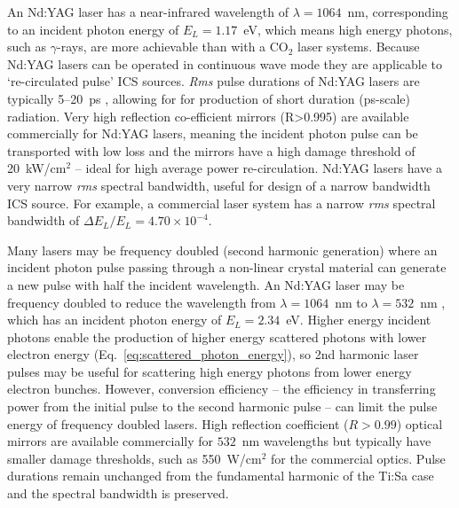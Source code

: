 \documentclass[../main.tex]{subfiles}
\begin{document}
An Nd:YAG laser has a near-infrared wavelength of $\lambda=1064$~\si{\nano\meter}, corresponding to an incident photon energy of $E_{L}=1.17$~\si{\electronvolt}, which means high energy photons, such as $\gamma$-rays, are more achievable than with a CO$_{2}$ laser systems. Because Nd:YAG lasers can be operated in continuous wave mode they are applicable to `re-circulated pulse' ICS sources. \textit{Rms} pulse durations of Nd:YAG lasers are typically 5--20~\si{\pico\second} \cite{pogorelsky2020converting,akagi2016narrow}, allowing for for production of short duration (\si{\pico\second}-scale) radiation. Very high reflection co-efficient mirrors (R>0.995) are available commercially for Nd:YAG lasers, meaning the incident photon pulse can be transported with low loss and the mirrors have a high damage threshold of 20~\si{\kilo\watt}/\si{\centi\meter}$^{2}$ \cite{thorlabs2021ndyagoptics} -- ideal for high average power re-circulation. Nd:YAG lasers have a very narrow \textit{rms} spectral bandwidth, useful for design of a narrow bandwidth ICS source. For example, a commercial laser system \cite{thorlabs2021ndyag200} has a narrow \textit{rms} spectral bandwidth of $\Delta E_{L}/E_{L} = 4.70\times 10^{-4}$. 

Many lasers may be frequency doubled (second harmonic generation) \cite{franken1961generation} where an incident photon pulse passing through a non-linear crystal material can generate a new pulse with half the incident wavelength. An Nd:YAG laser may be frequency doubled to reduce the wavelength from $\lambda=1064$~\si{\nano\meter} to $\lambda=532$~\si{\nano\meter} \cite{kozlovsky1988efficient}, which has an incident photon energy of $E_{L}=2.34$~\si{\electronvolt}. Higher energy incident photons enable the production of higher energy scattered photons with lower electron energy (Eq.~\ref{eq:scattered_photon_energy}), so 2nd harmonic laser pulses may be useful for scattering high energy photons from lower energy electron bunches. However, conversion efficiency -- the efficiency in transferring power from the initial pulse to the second harmonic pulse -- can limit the pulse energy of frequency doubled lasers. High reflection coefficient ($R>0.99$) optical mirrors are available commercially \cite{thorlabs2021ndyagoptics} for $532$~\si{\nano\meter} wavelengths but typically have smaller damage thresholds, such as 550~\si{\watt}/\si{\centi\meter}$^{2}$ for the commercial optics. Pulse durations remain unchanged from the fundamental harmonic of the Ti:Sa case and the spectral bandwidth is preserved.  
\end{document}

